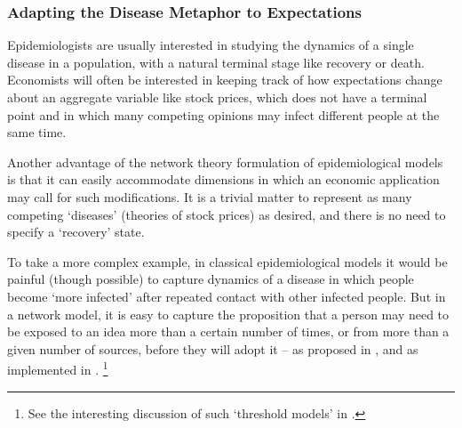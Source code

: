 

\subsubsection{Adapting the Disease Metaphor to Expectations}\label{subsubsec:AdaptingTheModel}
\hypertarget{AdaptingTheModel}{}

Epidemiologists are usually interested in studying the dynamics of a single disease in a population, with a natural terminal stage like recovery or death.  Economists will often be interested in keeping track of how expectations change about an aggregate variable like stock prices, which does not have a terminal point and in which many competing opinions may infect different people at the same time.

Another advantage of the network theory formulation of epidemiological models is that it can easily accommodate dimensions in which an economic application may call for such modifications.  It is a trivial matter to represent as many competing `diseases' (theories of stock prices) as desired, and there is no need to specify a `recovery' state.

To take a more complex example, in classical epidemiological models it would be painful (though possible) to capture dynamics of a disease in which people become  `more infected' after repeated contact with other infected people.  But in a network model, it is easy to capture the proposition that a person may need to be exposed to an idea more than a certain number of times, or from more than a given number of sources, before they will adopt it -- as proposed in \cite{granovetter1978threshold}, and as implemented in \cite{jackson2007diffusion}. \footnote{See the interesting discussion of such `threshold models' in \cite{glasserman2016contagion}.}

